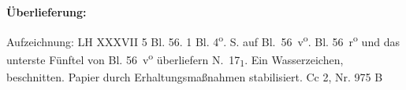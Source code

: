 \begin{ledgroupsized}[r]{120mm}
\footnotesize 
\pstart 
\noindent\textbf{\"{U}berlieferung:}
\pend
\end{ledgroupsized}

\begin{ledgroupsized}[r]{114mm}
\footnotesize 
\pstart \parindent -6mm
Aufzeichnung:
LH XXXVII 5 Bl. 56.
1 Bl. 4\textsuperscript{o}.
 S. auf Bl.~56~v\textsuperscript{o}.
Bl. 56~r\textsuperscript{o} und das unterste Fünftel von Bl. 56~v\textsuperscript{o} überliefern N.~17\textsubscript{1}.
Ein Wasserzeichen, beschnitten.
Papier durch Erhaltungsma{\ss}nahmen stabilisiert.%
\newline%
Cc 2, Nr. 975 B%
\pend
\end{ledgroupsized}

